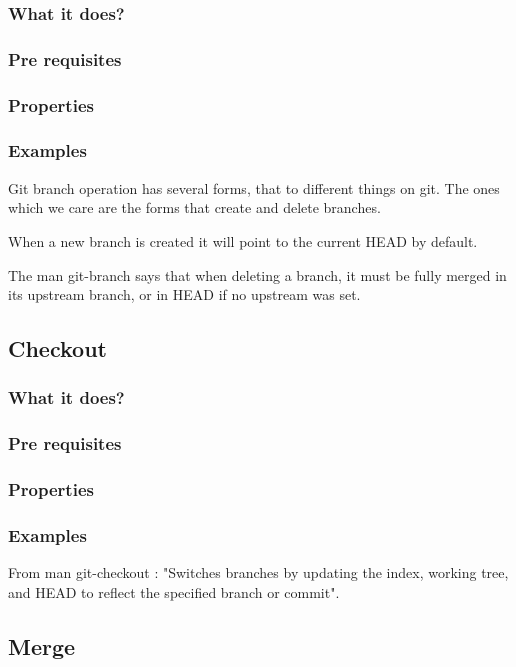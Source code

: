 \subsubsection{What it does?}
\subsubsection{Pre requisites}
\subsubsection{Properties}
\subsubsection{Examples}
Git branch operation has several forms, that to different things on git.
The ones which we care are the forms that create and delete branches. \par
When a new branch is created it will point to the current HEAD by default.
\par


The man git-branch says that when deleting a branch, it must be fully
merged in its upstream branch, or in HEAD if no upstream was set. \par


\subsection{Checkout}

\subsubsection{What it does?}
\subsubsection{Pre requisites}
\subsubsection{Properties}
\subsubsection{Examples}
From man git-checkout : "Switches branches by updating the index, 
working tree, and HEAD to reflect the specified branch or commit". \par

\subsection{Merge}

